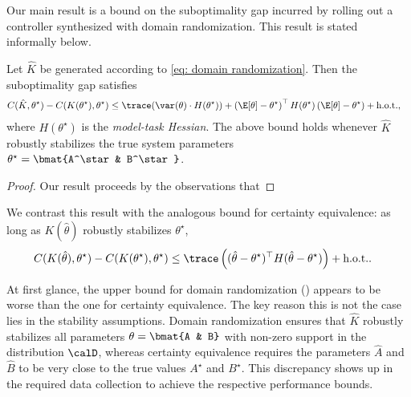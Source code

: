 Our main result is a bound on the suboptimality gap incurred by rolling out a controller synthesized with domain randomization. This result is stated informally below.

\begin{theorem}
    \label{thm: informal main result}
    Let $\hat K$ be generated according to \eqref{eq: domain randomization}. Then the suboptimality gap satisfies
    \begin{align*}
        &C(\hat K, \theta^\star) - C(K(\theta^\star), \theta^\star) \leq  \trace(\var(\theta) \cdot H(\theta^\star)) + \left(\E[\theta] - \theta^\star\right)^\top H(\theta^\star) \left(\E[\theta] - \theta^\star\right) + \text{h.o.t.},
    \end{align*}
    where $H(\theta^\star)$ is the \textit{model-task Hessian}. The above bound holds whenever $\hat K$ robustly stabilizes the true system parameters $\theta^\star = \bmat{A^\star & B^\star}$.
\end{theorem}

\begin{proof}
    Our result proceeds by the observations that 

\end{proof}

We contrast this result with the analogous bound for certainty equivalence: as long as $K(\hat \theta)$ robustly stabilizes $\theta^\star$,
\begin{equation}
\label{eq: certainty equivalence suboptimality gap}
\begin{aligned}
    &C(K(\hat \theta), \theta^\star) - C(K(\theta^\star), \theta^\star) \leq \trace\left((\hat \theta - \theta^\star)^\top H (\hat \theta - \theta^\star)\right) + \text{h.o.t.}.
\end{aligned}
\end{equation}

At first glance, the upper bound for domain randomization () appears to be worse than the one for certainty equivalence. The key reason this is not the case lies in the stability assumptions. Domain randomization ensures that $\hat K$ robustly stabilizes all parameters $\theta = \bmat{A & B}$ with non-zero support in the distribution $\calD$, whereas certainty equivalence requires the parameters $\hat A$ and $\hat B$ to be very close to the true values $A^\star$ and $B^\star$. This discrepancy shows up in the required data collection to achieve the respective performance bounds.

